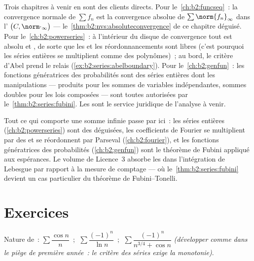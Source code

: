 \begin{remark}\label{rem:b2:series:perspectives}
Trois chapitres à venir en sont des clients directs. Pour
le~\cref{ch:b2:funcseq}~: la convergence normale de $\sum f_n$ est la
convergence absolue de $\sum\norm{f_n}_\infty$ dans l' $\bigl(C, \norm\cdot_\infty\bigr)$ --- le~\cref{thm:b2:nvs:absoluteconvergence}
de ce chapitre déguisé. Pour le~\cref{ch:b2:powerseries}~: à
l'intérieur du disque de convergence tout est absolu et , de
sorte que les  et les réordonnancements sont libres
(c'est pourquoi les séries entières se multiplient comme des
polynômes)~; au bord, le critère d'Abel prend le relais
(\cref{ex:b2:series:abelboundary}). Pour le~\cref{ch:b2:genfun}~: les
fonctions génératrices des probabilités sont des séries entières dont
les manipulations --- produits pour les sommes de variables
indépendantes, sommes doubles pour les lois composées --- sont toutes
autorisées par le~\cref{thm:b2:series:fubini}. Les 
sont le service juridique de l'analyse à venir.
\end{remark}

\begin{remark}
Tout ce qui comporte une somme infinie passe par ici~: les séries
entières (\cref{ch:b2:powerseries}) sont des 
déguisées, les coefficients de Fourier se multiplient par des
 et se réordonnent par Parseval
(\cref{ch:b2:fourier}), et les fonctions génératrices des
probabilités (\cref{ch:b2:genfun}) sont le théorème de Fubini
appliqué aux espérances. Le volume de Licence~3 absorbe les  dans l'intégration de Lebesgue par rapport à la mesure de
comptage --- où le~\cref{thm:b2:series:fubini} devient un cas
particulier du théorème de Fubini--Tonelli.
\end{remark}

\section{Exercices}

\begin{exercise}[$\star$]\label{exo:b2:series:1}
Nature de~: $\sum \dfrac{\cos n}{n}$~; $\;\sum \dfrac{(-1)^n}{\ln
n}$~; $\;\sum \dfrac{(-1)^n}{n^{3/4} + \cos n}$ \emph{(développer
comme dans le piège de première année~: le critère des séries
 exige la monotonie)}.
\end{exercise}

